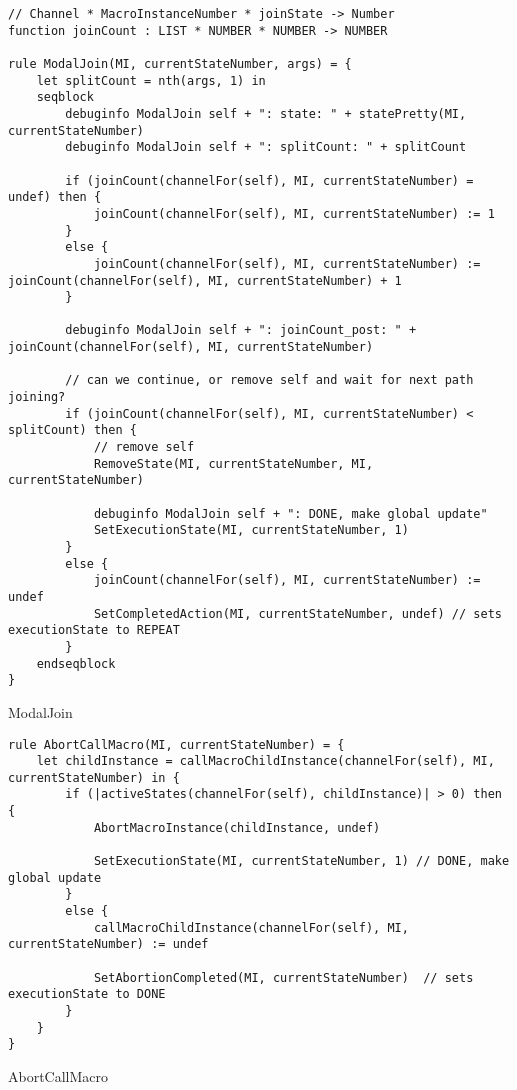 \begin{listing}[H]
\begin{verbatim}
// Channel * MacroInstanceNumber * joinState -> Number
function joinCount : LIST * NUMBER * NUMBER -> NUMBER

rule ModalJoin(MI, currentStateNumber, args) = {
    let splitCount = nth(args, 1) in
    seqblock
        debuginfo ModalJoin self + ": state: " + statePretty(MI, currentStateNumber)
        debuginfo ModalJoin self + ": splitCount: " + splitCount

        if (joinCount(channelFor(self), MI, currentStateNumber) = undef) then {
            joinCount(channelFor(self), MI, currentStateNumber) := 1
        }
        else {
            joinCount(channelFor(self), MI, currentStateNumber) := joinCount(channelFor(self), MI, currentStateNumber) + 1
        }

        debuginfo ModalJoin self + ": joinCount_post: " + joinCount(channelFor(self), MI, currentStateNumber)

        // can we continue, or remove self and wait for next path joining?
        if (joinCount(channelFor(self), MI, currentStateNumber) < splitCount) then {
            // remove self
            RemoveState(MI, currentStateNumber, MI, currentStateNumber)

            debuginfo ModalJoin self + ": DONE, make global update"
            SetExecutionState(MI, currentStateNumber, 1)
        }
        else {
            joinCount(channelFor(self), MI, currentStateNumber) := undef
            SetCompletedAction(MI, currentStateNumber, undef) // sets executionState to REPEAT
        }
    endseqblock
}
\end{verbatim}
\caption{ModalJoin}
\label{lst:asm:ModalJoin}
\end{listing}




\begin{listing}[H]
\begin{verbatim}
rule AbortCallMacro(MI, currentStateNumber) = {
    let childInstance = callMacroChildInstance(channelFor(self), MI, currentStateNumber) in {
        if (|activeStates(channelFor(self), childInstance)| > 0) then {
            AbortMacroInstance(childInstance, undef)

            SetExecutionState(MI, currentStateNumber, 1) // DONE, make global update
        }
        else {
            callMacroChildInstance(channelFor(self), MI, currentStateNumber) := undef

            SetAbortionCompleted(MI, currentStateNumber)  // sets executionState to DONE
        }
    }
}
\end{verbatim}
\caption{AbortCallMacro}
\label{lst:asm:AbortCallMacro}
\end{listing}




